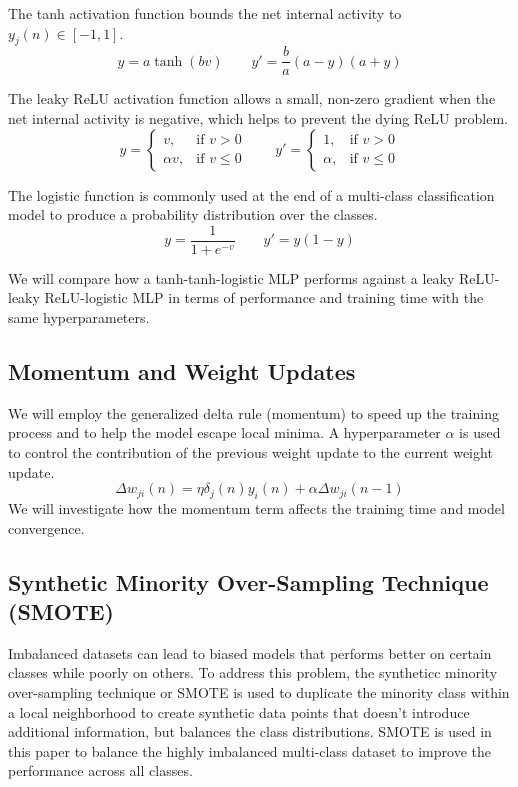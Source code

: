 \documentclass{acm_proc_article-sp}
\begin{document}
The tanh activation function bounds the net internal activity to $y_j(n) \in [-1, 1]$.
\begin{equation}
    y = a\tanh{(bv)} \qquad y' = \frac{b}{a}(a - y)(a + y)
\end{equation}

The leaky ReLU activation function allows a small, non-zero gradient when the net internal activity is negative, which helps to prevent the dying ReLU problem.
\begin{equation}
    y = \begin{cases}
v, & \text{if } v > 0 \\
\alpha v, & \text{if } v \leq 0
\end{cases} \qquad y' = \begin{cases}
1, & \text{if } v > 0 \\
\alpha, & \text{if } v \leq 0
\end{cases}
\end{equation}

The logistic function is commonly used at the end of a multi-class classification model to produce a probability distribution over the classes.
\begin{equation}
    y = \frac{1}{1 + e^{-v}} \qquad y' = y(1 - y)
\end{equation}

We will compare how a tanh-tanh-logistic MLP performs against a leaky ReLU-leaky ReLU-logistic MLP in terms of performance and training time with the same hyperparameters.

\subsection{Momentum and Weight Updates}
We will employ the generalized delta rule (momentum) to speed up the training process and to help the model escape local minima. A hyperparameter $\alpha$ is used to control the contribution of the previous weight update to the current weight update. 
\begin{equation}
\Delta w_{ji}(n) = \eta \delta_j(n) y_i(n) + \alpha \Delta w_{ji}(n-1)
\end{equation}
We will investigate how the momentum term affects the training time and model convergence.

\subsection{Synthetic Minority Over-Sampling Technique (SMOTE)}
Imbalanced datasets can lead to biased models that performs better on certain classes while poorly on others. To address this problem, the syntheticc minority over-sampling technique or SMOTE is used to duplicate the minority class within a local neighborhood to create synthetic data points that doesn't introduce additional information, but balances the class distributions. SMOTE is used in this paper to balance the highly imbalanced multi-class dataset to improve the performance across all classes.
\end{document}
